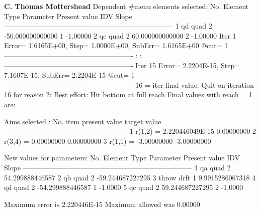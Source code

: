 \documentclass[11pt]{article} %
\begin{document}
\begin{center}  {\bf C. Thomas Mottershead }
   Dependent #menu elements selected:
 No.  Element    Type     Parameter   Present value       IDV  Slope
------------------------------------------------------------------------
  1   qd         quad       2      -50.000000000000        1  -1.00000
  2   qc         quad       2       60.000000000000        2  -1.00000
 Iter   1 Error= 1.6165E+00,  Step= 1.0000E+00,  SubErr= 1.6165E+00 @cut=    1
 -------------------------------------------------------
                    :
                    :
 -------------------------------------------------------
 Iter  15 Error= 2.2204E-15,  Step= 7.1607E-15,  SubErr= 2.2204E-15 @cut=    1
 -------------------------------------------------------
          16 = iter final value.
 Quit on iteration    16 for reason 2: Best effort: Hit bottom at full reach   
 Final values with reach =    1 are:
  
  Aims selected : 
 No.     item        present value        target value
-----------------------------------------------------
  1    r(1,2) =      2.220446049E-15      0.00000000    
  2    r(3,4) =       0.00000000          0.00000000    
  3    r(1,1) =      -3.00000000         -3.00000000    
  
  New values for parameters:
 No.  Element    Type   Parameter   Present value         IDV  Slope
------------------------------------------------------------------------
  1   qa         quad       2       54.299888446587    
  2   qb         quad       2      -59.244687227295    
  3   throw      drft       1       9.9915286067318    
  4   qd         quad       2      -54.299888446587        1   -1.0000
  5   qc         quad       2       59.244687227295        2   -1.0000
  
  Maximum error is     2.220446E-15
  Maximum allowed was   0.00000    


\end{center}
\end{document}
